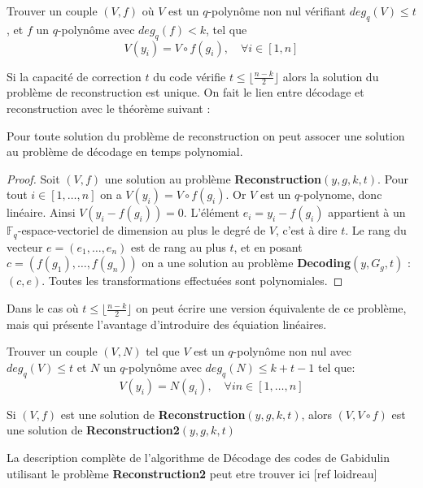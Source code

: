 \documentclass[12pt]{article}
\begin{document}
\begin{defi}[Reconstruction$(y,g,k,t)$]
Trouver un couple $(V,f)$ où $V$ est un $q$-polynôme non nul vérifiant $deg_q(V) \leq t$, et $f$ un $q$-polynôme avec $deg_q(f) < k$, tel que
$$ V(y_i) = V \circ f(g_i), \quad \forall i \in [1,n]$$
\end{defi}

Si la capacité de correction $t$ du code vérifie $t \leq \lfloor \frac{n-k}{2} \rfloor$ alors la solution du problème de reconstruction est unique. On fait le lien entre décodage et reconstruction avec le théorème suivant :

\begin{thm}
Pour toute solution du problème de reconstruction on peut assocer une solution au problème de décodage en temps polynomial.
\end{thm}

\begin{proof}
Soit $(V,f)$ une solution au problème \textbf{Reconstruction}$(y,g,k,t)$. Pour tout $i \in [1, \ldots, n]$ on a $V(y_i) = V \circ f(g_i)$. Or $V$ est un $q$-polynome, donc linéaire. Ainsi   $V(y_i - f(g_i)) = 0$. L'élément $e_i = y_i - f(g_i)$ appartient à un $\mathbb{F}_q$-espace-vectoriel de dimension au plus le degré de $V$, c'est à dire $t$. Le rang du vecteur $e = (e_1, \ldots, e_n)$ est de rang au plus $t$, et en posant $c=(f(g_1), \ldots, f(g_n))$ on a une solution au problème \textbf{Decoding}$(y, G_g,t)$ : $(c,e)$. 
\newline
Toutes les transformations effectuées sont polynomiales.
\end{proof}

Dans le cas où $t \leq \lfloor \frac{n-k}{2} \rfloor$ on peut écrire une version équivalente de ce problème, mais qui présente l'avantage d'introduire des équiation linéaires. 

\begin{defi}[Reconstruction2$(y,g,k,t)$]
Trouver un couple $(V,N)$ tel que $V$ est un $q$-polynôme non nul avec $deg_q(V) \leq t$ et $N$ un $q$-polynôme avec $deg_q(N) \leq k+t-1$ tel que:
$$ V(y_i) = N(g_i), \quad \forall in \in [1,\ldots,n]$$
\end{defi}

\begin{thm}
Si $(V,f)$ est une solution de \textbf{Reconstruction}$(y,g,k,t)$, alors $(V, V \circ f)$ est une solution de \textbf{Reconstruction2}$(y,g,k,t)$
\end{thm}

La description complète de l'algorithme de Décodage des codes de Gabidulin utilisant le problème \textbf{Reconstruction2} peut etre trouver ici [ref loidreau]
\end{document}
